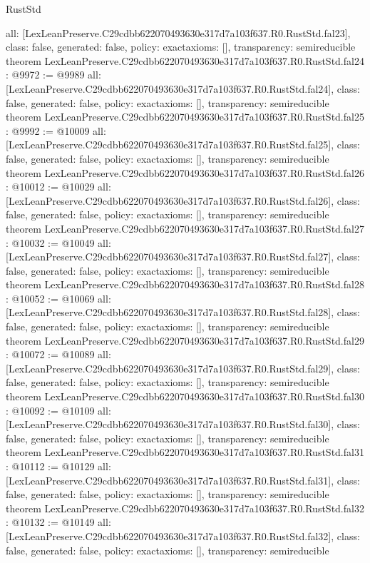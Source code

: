 \begin{lexlean}{RustStd}
\begin{coremodule}
{  all: [LexLeanPreserve.C29cdbb622070493630e317d7a103f637.R0.RustStd.fal23],
  class: false,
  generated: false,
  policy: exact{axioms: []},
  transparency: semireducible
}
theorem LexLeanPreserve.C29cdbb622070493630e317d7a103f637.R0.RustStd.fal24 : @9972 := @9989 {
  all: [LexLeanPreserve.C29cdbb622070493630e317d7a103f637.R0.RustStd.fal24],
  class: false,
  generated: false,
  policy: exact{axioms: []},
  transparency: semireducible
}
theorem LexLeanPreserve.C29cdbb622070493630e317d7a103f637.R0.RustStd.fal25 : @9992 := @10009 {
  all: [LexLeanPreserve.C29cdbb622070493630e317d7a103f637.R0.RustStd.fal25],
  class: false,
  generated: false,
  policy: exact{axioms: []},
  transparency: semireducible
}
theorem LexLeanPreserve.C29cdbb622070493630e317d7a103f637.R0.RustStd.fal26 : @10012 := @10029 {
  all: [LexLeanPreserve.C29cdbb622070493630e317d7a103f637.R0.RustStd.fal26],
  class: false,
  generated: false,
  policy: exact{axioms: []},
  transparency: semireducible
}
theorem LexLeanPreserve.C29cdbb622070493630e317d7a103f637.R0.RustStd.fal27 : @10032 := @10049 {
  all: [LexLeanPreserve.C29cdbb622070493630e317d7a103f637.R0.RustStd.fal27],
  class: false,
  generated: false,
  policy: exact{axioms: []},
  transparency: semireducible
}
theorem LexLeanPreserve.C29cdbb622070493630e317d7a103f637.R0.RustStd.fal28 : @10052 := @10069 {
  all: [LexLeanPreserve.C29cdbb622070493630e317d7a103f637.R0.RustStd.fal28],
  class: false,
  generated: false,
  policy: exact{axioms: []},
  transparency: semireducible
}
theorem LexLeanPreserve.C29cdbb622070493630e317d7a103f637.R0.RustStd.fal29 : @10072 := @10089 {
  all: [LexLeanPreserve.C29cdbb622070493630e317d7a103f637.R0.RustStd.fal29],
  class: false,
  generated: false,
  policy: exact{axioms: []},
  transparency: semireducible
}
theorem LexLeanPreserve.C29cdbb622070493630e317d7a103f637.R0.RustStd.fal30 : @10092 := @10109 {
  all: [LexLeanPreserve.C29cdbb622070493630e317d7a103f637.R0.RustStd.fal30],
  class: false,
  generated: false,
  policy: exact{axioms: []},
  transparency: semireducible
}
theorem LexLeanPreserve.C29cdbb622070493630e317d7a103f637.R0.RustStd.fal31 : @10112 := @10129 {
  all: [LexLeanPreserve.C29cdbb622070493630e317d7a103f637.R0.RustStd.fal31],
  class: false,
  generated: false,
  policy: exact{axioms: []},
  transparency: semireducible
}
theorem LexLeanPreserve.C29cdbb622070493630e317d7a103f637.R0.RustStd.fal32 : @10132 := @10149 {
  all: [LexLeanPreserve.C29cdbb622070493630e317d7a103f637.R0.RustStd.fal32],
  class: false,
  generated: false,
  policy: exact{axioms: []},
  transparency: semireducible
}

\end{coremodule}
\end{lexlean}
